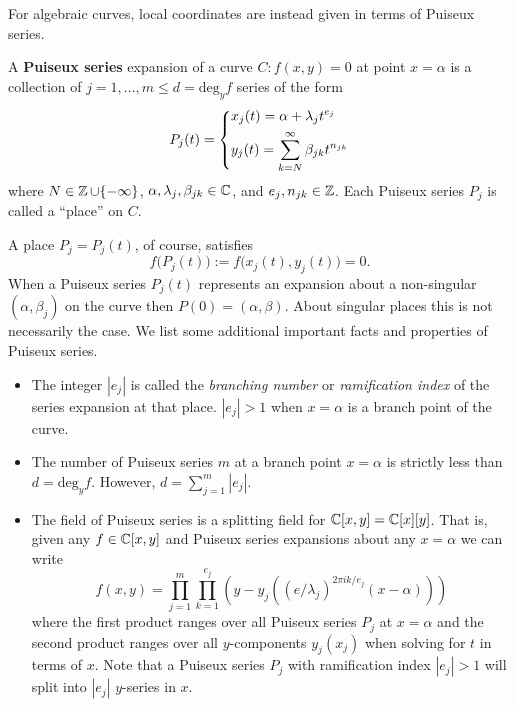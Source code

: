For algebraic curves, local coordinates are instead given in terms of
Puiseux series.
\begin{definition} \label{def: puiseux}
  A {\bf Puiseux series} expansion of a curve $C : f(x,y) = 0$ at point
  $x=\alpha$ is a collection of $j = 1,\ldots,m \leq d = \text{deg}_y f$
  series of the form
  \begin{align*}
      P_j(t) =
      \begin{dcases}
        x_j(t) = \alpha + \lambda_j t^{e_j} \\
        y_j(t) = \sum_{k=N}^\infty \beta_{jk} t^{n_{jk}}
      \end{dcases}
  \end{align*}
  where $N \in \operatorname{\mathbb{Z}} \cup \{-\infty\}$, $\alpha, \lambda_j, \beta_{jk} \in
  \operatorname{\mathbb{C}}$, and $e_j,n_{jk} \in \operatorname{\mathbb{Z}}$. Each Puiseux series $P_j$ is called a
  ``place'' on $C$.
\end{definition}
A place $P_j = P_j(t)$, of course, satisfies
\[
    f\big(P_j(t)\big) := f\big(x_j(t), y_j(t)\big) = 0.
\]
When a Puiseux series $P_j(t)$ represents an expansion about a
non-singular $(\alpha, \beta_j)$ on the curve then $P(0) =
(\alpha,\beta)$. About singular places this is not necessarily the
case. We list some additional important facts and properties of Puiseux
series.
\begin{itemize}
  \item The integer $|e_j|$ is called the {\it branching number} or {\it
    ramification index} of the series expansion at that place. $|e_j| >
    1$ when $x = \alpha$ is a branch point of the curve.
  \item The number of Puiseux series $m$ at a branch point $x = \alpha$
    is strictly less than $d = \text{deg}_y f$. However, $d =
    \sum_{j=1}^m |e_j|$.
  \item The field of Puiseux series is a splitting field for $\operatorname{\mathbb{C}}[x,y] =
    \operatorname{\mathbb{C}}[x][y]$. That is, given any $f \in \operatorname{\mathbb{C}}[x,y]$ and Puiseux series
    expansions about any $x=\alpha$ we can write
    \[
        f(x,y) = \prod_{j=1}^m \prod_{k=1}^{e_j} \left(
                 y - y_j\left(
                     (e/\lambda_j)^{2 \pi ik / e_j}(x-\alpha)
                     \right)
                 \right)
    \]
    where the first product ranges over all Puiseux series $P_j$ at
    $x=\alpha$ and the second product ranges over all $y$-components
    $y_j(x_j)$ when solving for $t$ in terms of $x$. Note that a Puiseux
    series $P_j$ with ramification index $|e_j|>1$ will split into
    $|e_j|$ $y$-series in $x$.
\end{itemize}

